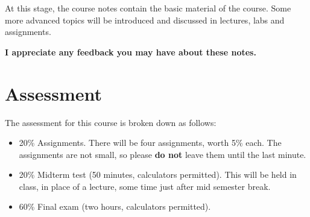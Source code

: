 At this stage, the course notes contain the basic material of the course. Some
more advanced topics will be introduced and discussed in lectures, labs and
assignments.\\

\begin{framed}
\begin{center}
{\bf 
I appreciate any feedback you may have about these notes.
}
\end{center}
\end{framed}

\section{Assessment}
The assessment for this course is broken down as follows:
\begin{itemize}
\item 20\% Assignments. There will be four assignments, worth 5\% each. The
assignments are not small, so please {\bf do not} leave them until the last minute.
\item 20\% Midterm test (50 minutes, calculators permitted). This will be held
in class, in place of a lecture, some time just after mid semester break.
\item 60\% Final exam (two hours, calculators permitted).
\end{itemize}

